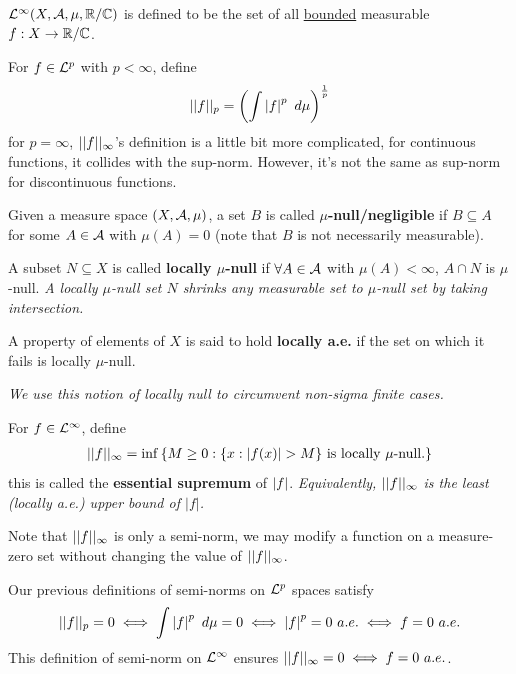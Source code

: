 \documentclass[11pt]{article}
\begin{document}
	\begin{definition}
		$\mathcal{{L}}^\infty(X, \mathcal{{A}}, \mu, \mathbb{R}/\mathbb{C})$ is defined to be the set of all \ul{bounded} measurable $f: X \to \mathbb{R}/\mathbb{C}$.
	\end{definition}
	
	\begin{definition}
		For $f \in \mathcal{{L}}^p$ with $p < \infty$, define
		\begin{align}
			\vert \vert {f} \vert \vert_p = \left(\int \left \vert {f} \right \vert^p\ d\mu \right)^{\frac{1}{p}}
		\end{align}
		for $p = \infty$, $\vert \vert {f} \vert \vert_\infty$'s definition is a little bit more complicated, for continuous functions, it collides with the sup-norm. However, it's not the same as sup-norm for discontinuous functions.
	\end{definition}
	
	\begin{definition}
		Given a measure space $(X, \mathcal{{A}}, \mu)$, a set $B$ is called \textbf{$\mu$-null/negligible} if $B \subseteq A$ for some $A \in \mathcal{{A}}$ with $\mu(A) = 0$ (note that $B$ is not necessarily measurable).
		
		A subset $N \subseteq X$ is called \textbf{locally $\mu$-null} if $\forall A \in \mathcal{{A}}$ with $\mu(A) < \infty$, $A \cap N$ is $\mu$-null. \emph{A locally $\mu$-null set $N$ shrinks any measurable set to $\mu$-null set by taking intersection.}
		
		A property of elements of $X$ is said to hold \textbf{locally a.e.} if the set on which it fails is locally $\mu$-null.
	\end{definition}
	\emph{We use this notion of locally null to circumvent non-sigma finite cases.}
	
	\begin{definition}
		For $f \in \mathcal{{L}}^\infty$, define
		\begin{align}
			\vert \vert {f} \vert \vert_\infty = \inf \left\{
			M \geq 0 : \{x : \left \vert {f(x)} \right \vert > M\} \text{{ is locally $\mu$-null.}}
			\right\}
		\end{align}
		this is called the \textbf{essential supremum} of $\left \vert {f} \right \vert$.
		\emph{Equivalently, $\vert \vert {f} \vert \vert_\infty$ is the least (locally a.e.) upper bound of $|f|$.}
		
		Note that $\vert \vert {f} \vert \vert_\infty$ is only a semi-norm, we may modify a function on a measure-zero set without changing the value of $\vert \vert {f} \vert \vert_\infty$.
		
		Our previous definitions of semi-norms on $\mathcal{{L}}^p$ spaces satisfy
		\begin{align}
			\vert \vert {f} \vert \vert_p = 0 \iff \int \left \vert {f} \right \vert^p\ d\mu = 0 \iff \left \vert {f} \right \vert^p = 0\ a.e. \iff f = 0\ a.e.
		\end{align}
		This definition of semi-norm on $\mathcal{{L}}^\infty$ ensures $\vert \vert {f} \vert \vert_\infty = 0 \iff f = 0\ a.e.$.
	\end{definition}
	
\end{document}
